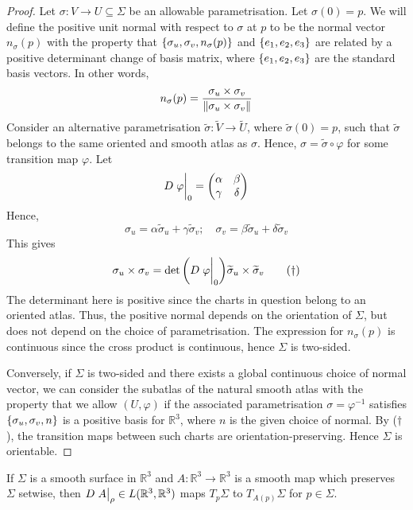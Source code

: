 \begin{proof}
	Let \( \sigma \colon V \to U \subseteq \Sigma \) be an allowable parametrisation.
	Let \( \sigma(0) = p \).
	We will define the positive unit normal with respect to \( \sigma \) at \( p \) to be the normal vector \( n_\sigma(p) \) with the property that \( \qty{\sigma_u, \sigma_v, n_\sigma(p)} \) and \( \qty{e_1, e_2, e_3} \) are related by a positive determinant change of basis matrix, where \( \qty{e_1, e_2, e_3} \) are the standard basis vectors.
	In other words,
	\[ n_\sigma(p) = \frac{\sigma_u \times \sigma_v}{\norm{\sigma_u \times \sigma_v}} \]
	Consider an alternative parametrisation \( \widetilde \sigma \colon \widetilde V \to \widetilde U \), where \( \widetilde \sigma(0) = p \), such that \( \widetilde \sigma \) belongs to the same oriented and smooth atlas as \( \sigma \).
	Hence, \( \sigma = \widetilde \sigma \circ \varphi \) for some transition map \( \varphi \).
	Let
	\[ D \eval{\varphi}_0 = \begin{pmatrix}
		\alpha & \beta \\
		\gamma & \delta
	\end{pmatrix} \]
	Hence,
	\[ \sigma_u = \alpha \widetilde \sigma_u + \gamma \widetilde \sigma_v;\quad \sigma_v = \beta \widetilde \sigma_u + \delta \widetilde \sigma_v \]
	This gives
	\begin{equation}
		\sigma_u \times \sigma_v = \det\qty(D \eval{\varphi}_0) \widetilde \sigma_u \times \widetilde \sigma_v \tag{\(\dagger\)}
	\end{equation}
	The determinant here is positive since the charts in question belong to an oriented atlas.
	Thus, the positive normal depends on the orientation of \( \Sigma \), but does not depend on the choice of parametrisation.
	The expression for \( n_\sigma(p) \) is continuous since the cross product is continuous, hence \( \Sigma \) is two-sided.

	Conversely, if \( \Sigma \) is two-sided and there exists a global continuous choice of normal vector, we can consider the subatlas of the natural smooth atlas with the property that we allow \( (U,\varphi) \) if the associated parametrisation \( \sigma = \varphi^{-1} \) satisfies \( \qty{\sigma_u, \sigma_v, n} \) is a positive basis for \( \mathbb R^3 \), where \( n \) is the given choice of normal.
	By (\(\dagger\)), the transition maps between such charts are orientation-preserving.
	Hence \( \Sigma \) is orientable.
\end{proof}
\begin{lemma}
	If \( \Sigma \) is a smooth surface in \( \mathbb R^3 \) and \( A \colon \mathbb R^3 \to \mathbb R^3 \) is a smooth map which preserves \( \Sigma \) setwise, then \( D\eval{A}_\rho \in L(\mathbb R^3, \mathbb R^3) \) maps \( T_p \Sigma \) to \( T_{A(p)} \Sigma \) for \( p \in \Sigma \).
\end{lemma}
